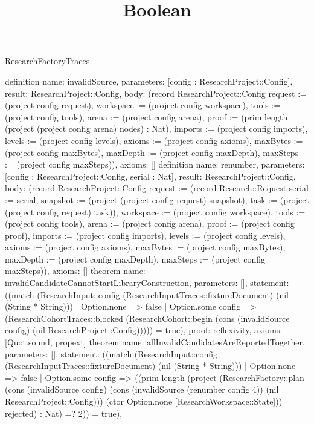\begin{lexlean}{ResearchFactoryTraces}
\title{Boolean}
\begin{semanticmodule}
definition{
 name: invalidSource,
 parameters: [config : ResearchProject::Config],
 result: ResearchProject::Config,
 body: (record ResearchProject::Config {request := (project config request), workspace := (project config workspace), tools := (project config tools), arena := (project config arena), proof := (prim length (project (project config arena) nodes) : Nat), imports := (project config imports), levels := (project config levels), axioms := (project config axioms), maxBytes := (project config maxBytes), maxDepth := (project config maxDepth), maxSteps := (project config maxSteps)}),
 axioms: []
}
definition{
 name: renumber,
 parameters: [config : ResearchProject::Config, serial : Nat],
 result: ResearchProject::Config,
 body: (record ResearchProject::Config {request := (record Research::Request {serial := serial, snapshot := (project (project config request) snapshot), task := (project (project config request) task)}), workspace := (project config workspace), tools := (project config tools), arena := (project config arena), proof := (project config proof), imports := (project config imports), levels := (project config levels), axioms := (project config axioms), maxBytes := (project config maxBytes), maxDepth := (project config maxDepth), maxSteps := (project config maxSteps)}),
 axioms: []
}
theorem{
 name: invalidCandidateCannotStartLibraryConstruction,
 parameters: [],
 statement: ((match (ResearchInput::config (ResearchInputTraces::fixtureDocument) (nil (String * String))) | Option.none => false | Option.some config => (ResearchCohortTraces::blocked (ResearchCohort::begin (cons (invalidSource config) (nil ResearchProject::Config))))) = true),
 proof: reflexivity{},
 axioms: [Quot.sound, propext]
}
theorem{
 name: allInvalidCandidatesAreReportedTogether,
 parameters: [],
 statement: ((match (ResearchInput::config (ResearchInputTraces::fixtureDocument) (nil (String * String))) | Option.none => false | Option.some config => ((prim length (project (ResearchFactory::plan (cons (invalidSource config) (cons (invalidSource (renumber config 4)) (nil ResearchProject::Config))) (ctor Option.none [ResearchWorkspace::State])) rejected) : Nat) =? 2)) = true),
}
\end{semanticmodule}
\end{lexlean}
